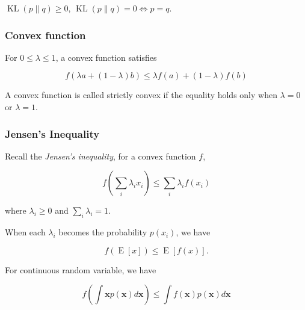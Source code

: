 \documentclass{article}
\begin{document}
                $ \operatorname{KL}(p \| q) \geq 0 $, $ \operatorname{KL}(p \| q) = 0 \iff p = q $.


            \subsubsection*{Convex function}
                
                For $ 0 \leq \lambda \leq 1 $, a convex function satisfies

                \begin{equation*}
                    f(\lambda a + (1 - \lambda) b) \leq \lambda f(a) + (1 - \lambda) f(b)
                \end{equation*}

                A convex function is called strictly convex if the equality
                holds only when $ \lambda = 0 $ or $ \lambda = 1 $.

            \subsubsection*{Jensen's Inequality}

                Recall the \textit{Jensen's inequality}, for a convex function $ f $,

                \begin{equation*}
                    f \left( \sum_{i} \lambda_{i} x_{i}  \right) \leq \sum_{i} \lambda_{i} f(x_{i})
                \end{equation*}

                where $ \lambda_{i} \geq 0 $ and $ \sum_{i} \lambda_{i} = 1 $.

                When each $ \lambda_{i} $ becomes the probability $ p(x_{i}) $, we have

                \begin{equation*}
                    f\left( \operatorname{E}[x] \right) \leq \operatorname{E}[f(x)].
                \end{equation*}

                For continuous random variable, we have

                \begin{equation*}
                     f\left( \int \mathbf{x} p(\mathbf{x}) d \mathbf{x} \right)
                     \leq \int f(\mathbf{x}) p(\mathbf{x}) d \mathbf{x}
                \end{equation*}
\end{document}
